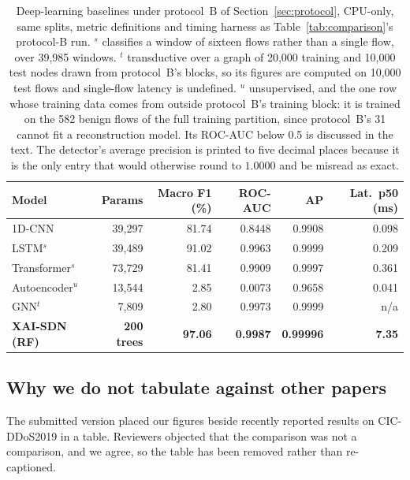 \documentclass{ieeeaccess}
\begin{document}
\begin{table}[!t]
\caption{Deep-learning baselines under protocol~B of Section~\ref{sec:protocol},
CPU-only, same splits, metric definitions and timing harness as
Table~\ref{tab:comparison}'s protocol-B run. $^{s}$ classifies a window of
sixteen flows rather than a single flow, over 39,985 windows. $^{t}$ transductive
over a graph of 20,000 training and 10,000 test nodes drawn from protocol~B's
blocks, so its figures are computed on 10,000 test flows and single-flow latency
is undefined. $^{u}$ unsupervised, and the one row whose training data comes from
outside protocol~B's training block: it is trained on the 582 benign flows of the
full training partition, since protocol~B's 31 cannot fit a reconstruction model.
Its ROC-AUC below 0.5 is
discussed in the text. The detector's average precision is printed to five decimal
places because it is the only entry that would otherwise round to $1.0000$ and be
misread as exact.}
\centering
\label{tab:deep}
\footnotesize
\setlength{\tabcolsep}{3pt}
\renewcommand{\arraystretch}{1.15}
\begin{tabular}{@{}lrrrrr@{}}
\toprule
\textbf{Model} & \textbf{Params} & \textbf{Macro F1 (\%)} & \textbf{ROC-AUC} &
\textbf{AP} & \textbf{Lat.\ p50 (ms)} \\
\midrule
1D-CNN               & 39,297 & 81.74 & 0.8448 & 0.9908 & 0.098 \\
LSTM$^{s}$           & 39,489 & 91.02 & 0.9963 & 0.9999 & 0.209 \\
Transformer$^{s}$    & 73,729 & 81.41 & 0.9909 & 0.9997 & 0.361 \\
Autoencoder$^{u}$    & 13,544 &  2.85 & 0.0073 & 0.9658 & 0.041 \\
GNN$^{t}$            &  7,809 &  2.80 & 0.9973 & 0.9999 & n/a \\
\midrule
\textbf{XAI-SDN (RF)} & \textbf{200 trees} & \textbf{97.06} & \textbf{0.9987} &
\textbf{0.99996} & \textbf{7.35} \\
\bottomrule
\end{tabular}
\end{table}

\subsection{Why we do not tabulate against other papers}
\label{sec:related_quant}
The submitted version placed our figures beside recently reported results on
CIC-DDoS2019 in a table. Reviewers objected that the comparison was not a
comparison, and we agree, so the table has been removed rather than re-captioned.
\end{document}
